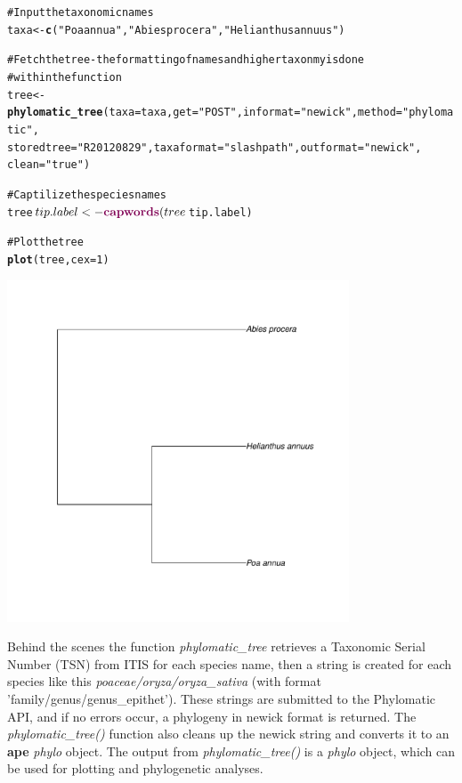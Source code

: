 \documentclass[letterpaper,superscriptaddress,showkeys,longbibliography,10pt]{revtex4-1}\usepackage{graphicx, color}
\makeatletter
\newcommand{\hlfunctioncall}[1]{\textcolor[rgb]{0.501960784313725,0,0.329411764705882}{\textbf{#1}}}%
\newcommand{\hlstring}[1]{\textcolor[rgb]{0.6,0.6,1}{#1}}%
\newcommand{\hlcomment}[1]{\textcolor[rgb]{0.180392156862745,0.6,0.341176470588235}{#1}}%
\newenvironment{kframe}{%
 \def\at@end@of@kframe{}%
 \ifinner\ifhmode%
  \def\at@end@of@kframe{\end{minipage}}%
  \begin{minipage}{\columnwidth}%
 \fi\fi%
 \def\FrameCommand##1{\hskip\@totalleftmargin \hskip-\fboxsep
 \colorbox{shadecolor}{##1}\hskip-\fboxsep
     \hskip-\linewidth \hskip-\@totalleftmargin \hskip\columnwidth}%
 \MakeFramed {\advance\hsize-\width
   \@totalleftmargin\z@ \linewidth\hsize
   \@setminipage}}%
 {\par\unskip\endMakeFramed%
 \at@end@of@kframe}
\newenvironment{knitrout}{}{} %
\makeatother
\begin{document}
\begin{knitrout}
\color{fgcolor}\begin{kframe}
\begin{alltt}
\hlcomment{# Input the taxonomic names}
taxa <- \hlfunctioncall{c}(\hlstring{"Poa annua"}, \hlstring{"Abies procera"}, \hlstring{"Helianthus annuus"})

\hlcomment{# Fetch the tree - the formatting of names and higher taxonmy is done}
\hlcomment{# within the function}
tree <- \hlfunctioncall{phylomatic_tree}(taxa = taxa, get = \hlstring{"POST"}, informat = \hlstring{"newick"}, method = \hlstring{"phylomatic"}, 
    storedtree = \hlstring{"R20120829"}, taxaformat = \hlstring{"slashpath"}, outformat = \hlstring{"newick"}, 
    clean = \hlstring{"true"})

\hlcomment{# Captilize the species names}
tree$tip.label <- \hlfunctioncall{capwords}(tree$tip.label)

\hlcomment{# Plot the tree}
\hlfunctioncall{plot}(tree, cex = 1)
\end{alltt}
\end{kframe}

{\centering \includegraphics[width=4in,height=4in]{figure/phylomaticphylogeny} 

}



\end{knitrout}


Behind the scenes the function \emph{phylomatic\_tree} retrieves a Taxonomic Serial Number (TSN) from ITIS for each species name, then a string is created for each species like this \emph{poaceae/oryza/oryza\_sativa} (with format 'family/genus/genus\_epithet'). These strings are submitted to the Phylomatic API, and if no errors occur, a phylogeny in newick format is returned. The \emph{phylomatic\_tree()} function also cleans up the newick string and converts it to an \textbf{ape} \emph{phylo} object. The output from \emph{phylomatic\_tree()} is a \emph{phylo} object, which can be used for plotting and phylogenetic analyses. 
\end{document}
